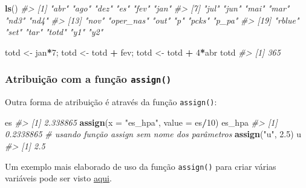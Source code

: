 \documentclass[]{book}
\newenvironment{Shaded}{\begin{snugshade}}{\end{snugshade}}
\newcommand{\KeywordTok}[1]{\textcolor[rgb]{0.13,0.29,0.53}{\textbf{#1}}}
\newcommand{\DataTypeTok}[1]{\textcolor[rgb]{0.13,0.29,0.53}{#1}}
\newcommand{\DecValTok}[1]{\textcolor[rgb]{0.00,0.00,0.81}{#1}}
\newcommand{\FloatTok}[1]{\textcolor[rgb]{0.00,0.00,0.81}{#1}}
\newcommand{\StringTok}[1]{\textcolor[rgb]{0.31,0.60,0.02}{#1}}
\newcommand{\CommentTok}[1]{\textcolor[rgb]{0.56,0.35,0.01}{\textit{#1}}}
\newcommand{\OperatorTok}[1]{\textcolor[rgb]{0.81,0.36,0.00}{\textbf{#1}}}
\newcommand{\NormalTok}[1]{#1}
\begin{document}
\begin{Shaded}
\begin{Highlighting}[]
\KeywordTok{ls}\NormalTok{()}
\CommentTok{#>  [1] "abr"      "ago"      "dez"      "es"       "fev"      "jan"     }
\CommentTok{#>  [7] "jul"      "jun"      "mai"      "mar"      "nd3"      "nd4"     }
\CommentTok{#> [13] "nov"      "oper_nas" "out"      "p"        "pcks"     "p_pa"    }
\CommentTok{#> [19] "rblue"    "set"      "tar"      "totd"     "y1"       "y2"}
\end{Highlighting}
\end{Shaded}

\begin{Shaded}
\begin{Highlighting}[]
\NormalTok{totd <-}\StringTok{ }\NormalTok{jan}\OperatorTok{*}\DecValTok{7}\NormalTok{; totd <-}\StringTok{ }\NormalTok{totd }\OperatorTok{+}\StringTok{ }\NormalTok{fev; totd <-}\StringTok{ }\NormalTok{totd }\OperatorTok{+}\StringTok{ }\DecValTok{4}\OperatorTok{*}\NormalTok{abr}
\NormalTok{totd}
\CommentTok{#> [1] 365}
\end{Highlighting}
\end{Shaded}

\subsubsection{\texorpdfstring{Atribuição com a função
\texttt{assign()}}{Atribuição com a função assign()}}\label{atribuicao-com-a-funcao-assign}

Outra forma de atribuição é através da função \texttt{assign()}:

\begin{Shaded}
\begin{Highlighting}[]
\NormalTok{es}
\CommentTok{#> [1] 2.338865}
\KeywordTok{assign}\NormalTok{(}\DataTypeTok{x =} \StringTok{"es_hpa"}\NormalTok{, }\DataTypeTok{value =}\NormalTok{ es}\OperatorTok{/}\DecValTok{10}\NormalTok{)}
\NormalTok{es_hpa}
\CommentTok{#> [1] 0.2338865}
\CommentTok{# usando função assign sem nome dos parâmetros}
\KeywordTok{assign}\NormalTok{(}\StringTok{"u"}\NormalTok{, }\FloatTok{2.5}\NormalTok{)}
\NormalTok{u}
\CommentTok{#> [1] 2.5}
\end{Highlighting}
\end{Shaded}

Um exemplo mais elaborado de uso da função \texttt{assign()} para criar
várias variáveis pode ser visto
\href{https://gist.github.com/lhmet/d28856ed16690bb45d5be36ea4f5d458\#file-assign-ex-rmd}{aqui}.
\end{document}
